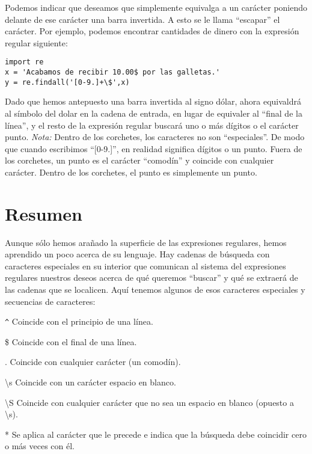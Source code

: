 Podemos indicar que deseamos que simplemente equivalga a un carácter poniendo delante de ese carácter
una barra invertida. A esto se le llama ``escapar'' el carácter. Por ejemplo, podemos encontrar
cantidades de dinero con la expresión regular siguiente:

\beforeverb
\begin{verbatim}
import re
x = 'Acabamos de recibir 10.00$ por las galletas.'
y = re.findall('[0-9.]+\$',x)
\end{verbatim}
\afterverb
%
Dado que hemos antepuesto una barra invertida al signo dólar, ahora equivaldrá al símbolo del dolar
en la cadena de entrada, en lugar de equivaler al ``final de la línea'', y el resto de la expresión
regular buscará uno o más dígitos o el carácter punto. {\em Nota:} Dentro de los corchetes,
los caracteres no son ``especiales''. De modo que cuando escribimos ``[0-9.]'', en realidad
significa dígitos o un punto. Fuera de los corchetes, un punto es el carácter ``comodín'' y
coincide con cualquier carácter. Dentro de los corchetes, el punto es simplemente un punto.

\section{Resumen}

Aunque sólo hemos arañado la superficie de las expresiones regulares, hemos aprendido un poco
acerca de su lenguaje. Hay cadenas de búsqueda con caracteres especiales en su interior que
comunican al sistema del expresiones regulares nuestros deseos acerca de qué queremos ``buscar''
y qué se extraerá de las cadenas que se localicen. Aquí tenemos algunos de esos caracteres especiales
y secuencias de caracteres:

\verb"^" \newline
Coincide con el principio de una línea.

\$ \newline
Coincide con el final de una línea.

. \newline
Coincide con cualquier carácter (un comodín).

{\textbackslash}s \newline
Coincide con un carácter espacio en blanco.

{\textbackslash}S \newline
Coincide con cualquier carácter que no sea un espacio en blanco (opuesto a {\textbackslash}s).

* \newline
Se aplica al carácter que le precede e indica que la búsqueda debe coincidir cero o más veces con él.


